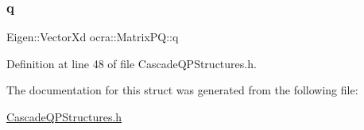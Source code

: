 \subsubsection{\texorpdfstring{q}{q}}
{\footnotesize\ttfamily Eigen\+::\+Vector\+Xd ocra\+::\+Matrix\+P\+Q\+::q}



Definition at line 48 of file Cascade\+Q\+P\+Structures.\+h.



The documentation for this struct was generated from the following file\+:\begin{DoxyCompactItemize}
\item 
\hyperlink{CascadeQPStructures_8h}{Cascade\+Q\+P\+Structures.\+h}\end{DoxyCompactItemize}
